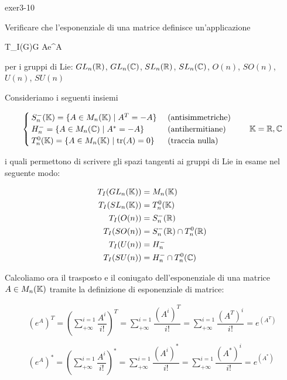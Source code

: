 {exer3-10}
{
Verificare che l'esponenziale di una matrice definisce un'applicazione

	{T_{I}(G)}{G}
	{A}{e^{A}}

per i gruppi di Lie: $ GL_{n}(\mathbb{R}) $, $ GL_{n}(\mathbb{C}) $, $ SL_{n}(\mathbb{R}) $, $ SL_{n}(\mathbb{C}) $, $ O(n) $, $ SO(n) $, $ U(n) $, $ SU(n) $
}
{
Consideriamo i seguenti insiemi

\begin{equation}
	\begin{cases}
		S^{-}_{n}(\K) = \{ A \in M_{n}(\K) \mid A^{T} = - A \} & \text{ (antisimmetriche)} \\
		H^{-}_{n} = \{ A \in M_{n}(\C) \mid A^{*} = - A \} & \text{ (antihermitiane)} \\
		T^{0}_{n}(\K) = \{ A \in M_{n}(\K) \mid \tr(A) = 0 \} & \text{ (traccia nulla)}
	\end{cases} %
	\qquad \K = \R, \C
\end{equation}

i quali permettono di scrivere gli spazi tangenti ai gruppi di Lie in esame nel seguente modo:

\begin{align}
	T_{I}(GL_{n}(\mathbb{K})) &= M_{n}(\mathbb{K}) \\
	T_{I}(SL_{n}(\mathbb{K})) &= T^{0}_{n}(\mathbb{K}) \\
	T_{I}(O(n)) &= S^{-}_{n}(\mathbb{R}) \\
	T_{I}(SO(n)) &= S^{-}_{n}(\mathbb{R}) \cap T^{0}_{n}(\mathbb{R}) \\
	T_{I}(U(n)) &= H^{-}_{n} \\
	T_{I}(SU(n)) &= H^{-}_{n} \cap T^{0}_{n}(\mathbb{C})
\end{align}

Calcoliamo ora il trasposto e il coniugato dell'esponenziale di una matrice $ A \in M_{n}(\mathbb{K}) $ tramite la definizione di esponenziale di matrice:

\begin{gather}
	\left( e^{A} \right)^{T} = \left( \sum_{+ \infty}^{i=1} \dfrac{A^{i}}{i !} \right)^{T} %
	= \sum_{+ \infty}^{i=1} \dfrac{(A^{i})^{T}}{i !} %
	= \sum_{+ \infty}^{i=1} \dfrac{\left( A^{T} \right)^{i}}{i !} %
	= e^{\left( A^{T} \right)} \\
	\nonumber \\
	\left( e^{A} \right)^{*} = \left( \sum_{+ \infty}^{i=1} \dfrac{A^{i}}{i !} \right)^{*} %
	= \sum_{+ \infty}^{i=1} \dfrac{(A^{i})^{*}}{i !} %
	= \sum_{+ \infty}^{i=1} \dfrac{\left( A^{*} \right)^{i}}{i !} %
	= e^{\left( A^{*} \right)}
\end{gather}

}
